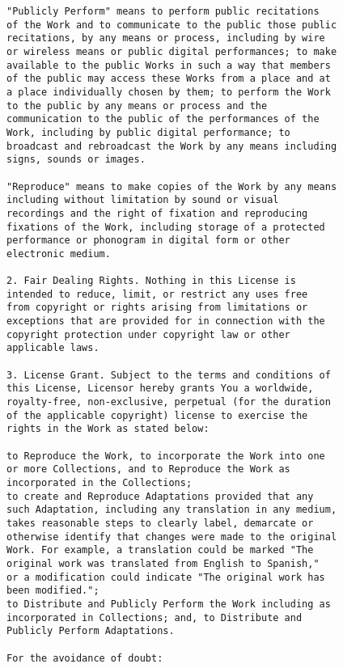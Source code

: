 \begin{verbatim}
"Publicly Perform" means to perform public recitations
of the Work and to communicate to the public those public
recitations, by any means or process, including by wire
or wireless means or public digital performances; to make
available to the public Works in such a way that members
of the public may access these Works from a place and at
a place individually chosen by them; to perform the Work
to the public by any means or process and the
communication to the public of the performances of the
Work, including by public digital performance; to
broadcast and rebroadcast the Work by any means including
signs, sounds or images.

"Reproduce" means to make copies of the Work by any means
including without limitation by sound or visual
recordings and the right of fixation and reproducing
fixations of the Work, including storage of a protected
performance or phonogram in digital form or other
electronic medium.

2. Fair Dealing Rights. Nothing in this License is
intended to reduce, limit, or restrict any uses free
from copyright or rights arising from limitations or
exceptions that are provided for in connection with the
copyright protection under copyright law or other
applicable laws.

3. License Grant. Subject to the terms and conditions of
this License, Licensor hereby grants You a worldwide,
royalty-free, non-exclusive, perpetual (for the duration
of the applicable copyright) license to exercise the
rights in the Work as stated below:

to Reproduce the Work, to incorporate the Work into one
or more Collections, and to Reproduce the Work as
incorporated in the Collections;
to create and Reproduce Adaptations provided that any
such Adaptation, including any translation in any medium,
takes reasonable steps to clearly label, demarcate or
otherwise identify that changes were made to the original
Work. For example, a translation could be marked "The
original work was translated from English to Spanish,"
or a modification could indicate "The original work has
been modified.";
to Distribute and Publicly Perform the Work including as
incorporated in Collections; and, to Distribute and
Publicly Perform Adaptations.

For the avoidance of doubt:


\end{verbatim}
